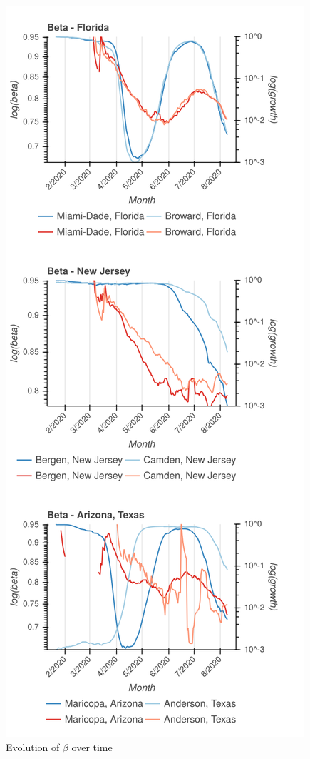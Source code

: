 \documentclass{article}
\begin{document}
\begin{figure}
\includegraphics[width=\columnwidth]{img/betas.png}
\caption{Evolution of \(\beta\) over time}
\end{figure}
\end{document}
